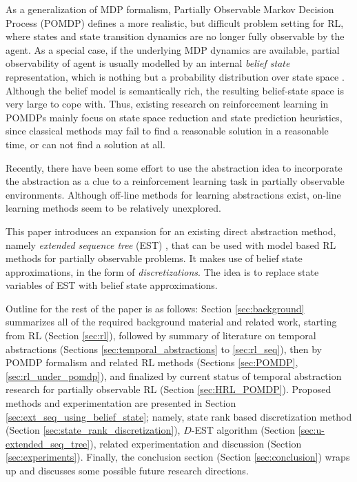 \documentclass[10pt, conference, compsocconf]{IEEEtran}
\begin{document}
As a generalization of MDP formalism, Partially Observable Markov Decision Process (POMDP) defines a more realistic, but difficult problem setting for RL, where states and state transition dynamics are no longer fully observable by the agent. As a special case, if the underlying MDP dynamics are available, partial observability of agent is usually modelled by an internal \textit{belief state} representation, which is nothing but a probability distribution over state space \cite{kaelbling_reinforcement_1996}. Although the belief model is semantically rich, the resulting belief-state space is very large to cope with. Thus, existing research on reinforcement learning in POMDPs mainly focus on state space reduction and state prediction heuristics, since classical methods may fail to find a reasonable solution in a reasonable time, or can not find a solution at all.


Recently, there have been some effort to use the abstraction idea to incorporate the abstraction as a clue to a reinforcement learning task in partially observable environments. Although off-line methods for learning abstractions exist, on-line learning methods seem to be relatively unexplored.

This paper introduces an expansion for an existing direct abstraction method, namely \textit{extended sequence tree} (EST)  \cite{girgin_improving_2010}, that can be used with model based RL methods for partially observable problems. It makes use of belief state approximations, in the form of \textit{discretizations}. The idea is to replace state variables of EST with belief state approximations.

Outline for the rest of the paper is as follows: Section \ref{sec:background} summarizes all of the required background material and related work, starting from RL (Section \ref{sec:rl}), followed by summary of literature on temporal abstractions (Sections \ref{sec:temporal_abstractions} to \ref{sec:rl_seq}), then by POMDP formalism and related RL methods (Sections \ref{sec:POMDP}, \ref{sec:rl_under_pomdp}), and finalized by current status of temporal abstraction research for partially observable RL (Section \ref{sec:HRL_POMDP}). Proposed methods and experimentation are presented in Section \ref{sec:ext_seq_using_belief_state}; namely, state rank based discretization method (Section \ref{sec:state_rank_discretization}), $D$-EST algorithm (Section \ref{sec:u-extended_seq_tree}), related experimentation and discussion (Section \ref{sec:experiments}). Finally, the conclusion section (Section \ref{sec:conclusion}) wraps up and discusses some possible future research directions.
\end{document}

